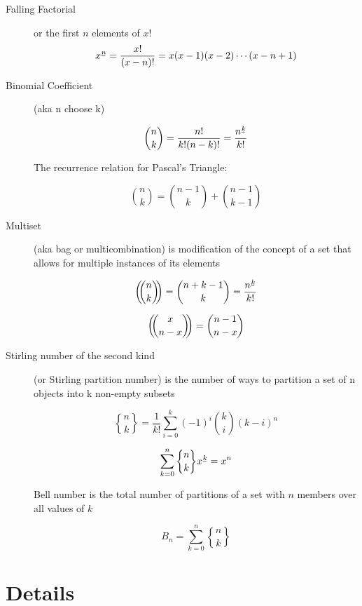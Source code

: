 \documentclass[]{article}
\newcommand{\fallingfactorial}[1]{%
  ^{\mspace{1mu}\underline{#1\mspace{-2mu}}\mspace{2mu}}%
}
\newcommand{\stirlingii}{\genfrac{\{}{\}}{0pt}{}}
\newcommand{\multichoose}[2]{\bigg(\!\!\dbinom{#1}{#2}\!\!\bigg)}
\begin{document}
\begin{description}

\item [Falling Factorial] or the first $n$ elements of $x!$ \\

$$x\fallingfactorial{n} = \frac{x!}{(x-n)!} = x(x-1)(x-2)\cdots(x-n+1)$$

\item [Binomial Coefficient] (aka n choose k)

$$\binom{n}{k} =  \frac{n!}{k!(n-k)!} = \frac{n\fallingfactorial{k}}{k!}$$

The recurrence relation for Pascal's Triangle:

$$\binom{n}{k} = \binom{n-1}{k} + \binom{n-1}{k-1}$$

\item [Multiset] (aka bag or multicombination) is modification of the concept of a set that allows for multiple instances of its elements

$$\multichoose{n}{k} = \binom{n+k-1}{k} = \frac{n\fallingfactorial{k}}{k!}$$

$$\multichoose{x}{n-x} = \binom{n-1}{n-x}$$

\item [Stirling number of the second kind] (or Stirling partition number) is the number of ways to partition a set of n objects into k non-empty subsets

$$\stirlingii{n}{k} = \frac{1}{k!}\sum_{i=0}^{k}{(-1)^i \binom{k}{i} (k-i)^n}$$

$$\sum_{k=0}^{n}{\stirlingii{n}{k} x\fallingfactorial{k}} = x^n$$

Bell number is the total number of partitions of a set with $n$ members over all values of $k$

$$B_n = \sum_{k=0}^{n} \stirlingii{n}{k}$$

\end{description}

\section*{Details}
\end{document}
